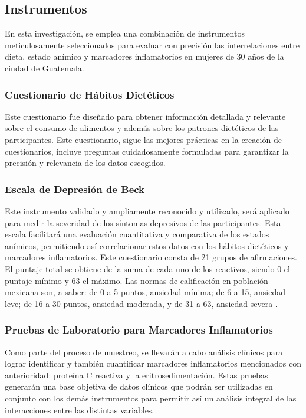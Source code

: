 \documentclass[jou]{apa7}
\begin{document}
	
	\subsection{Instrumentos}\label{instrumentos}
	
	En esta investigación, se emplea una combinación de instrumentos
	meticulosamente seleccionados para evaluar con precisión las
	interrelaciones entre dieta, estado anímico y marcadores inflamatorios
	en mujeres de 30 años de la ciudad de Guatemala.\\
	
	
	\subsubsection{Cuestionario de Hábitos Dietéticos}Este cuestionario fue
	diseñado para obtener información detallada y relevante sobre el consumo
	de alimentos y además sobre los patrones dietéticos de las
	participantes. Este cuestionario, sigue las mejores prácticas en la
	creación de cuestionarios, incluye preguntas cuidadosamente formuladas
	para garantizar la precisión y relevancia de los datos escogidos.\\
	
	\subsubsection{Escala de Depresión de Beck} Este instrumento validado y
	ampliamente reconocido y utilizado, será aplicado para medir la
	severidad de los síntomas depresivos de las participantes. Esta escala
	facilitará una evaluación cuantitativa y comparativa de los estados
	anímicos, permitiendo así correlacionar estos datos con los hábitos
	dietéticos y marcadores inflamatorios. Este cuestionario consta de 21
	grupos de afirmaciones.\\
	
	El puntaje total se obtiene de la suma de cada uno de los reactivos,
	siendo 0 el puntaje mínimo y 63 el máximo. Las normas de calificación en
	población mexicana son, a saber: de 0 a 5 puntos, ansiedad mínima; de 6
	a 15, ansiedad leve; de 16 a 30 puntos, ansiedad moderada, y de 31 a 63,
	ansiedad severa \parencite{beckDepressionCausesTreatment2009}.\\
	
	\subsubsection{Pruebas de Laboratorio para Marcadores Inflamatorios} Como parte
	del proceso de muestreo, se llevarán a cabo análisis clínicos para
	lograr identificar y también cuantificar marcadores inflamatorios
	mencionados con anterioridad: proteína C reactiva y la
	eritrosedimentación. Estas pruebas generarán una base objetiva de datos
	clínicos que podrán ser utilizadas en conjunto con los demás
	instrumentos para permitir así un análisis integral de las interacciones
	entre las distintas variables.
	
\end{document}
